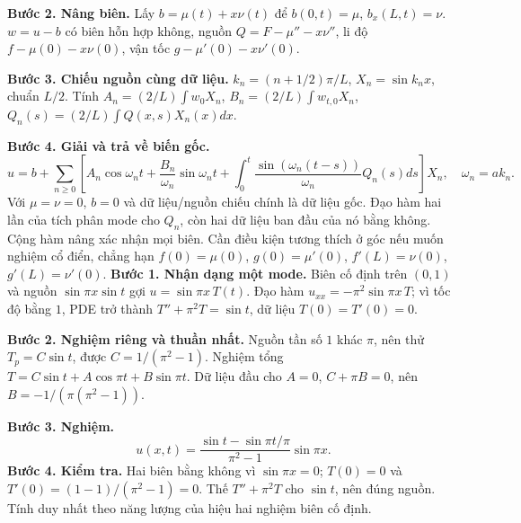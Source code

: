 \textbf{Bước 2. Nâng biên.} Lấy $b=\mu(t)+x\nu(t)$ để $b(0,t)=\mu$, $b_x(L,t)=\nu$. $w=u-b$ có biên hỗn hợp không, nguồn $Q=F-\mu''-x\nu''$, li độ $f-\mu(0)-x\nu(0)$, vận tốc $g-\mu'(0)-x\nu'(0)$.

\textbf{Bước 3. Chiếu nguồn cùng dữ liệu.} $k_n=(n+1/2)\pi/L$, $X_n=\sin k_nx$, chuẩn $L/2$. Tính $A_n=(2/L)\int w_0X_n$, $B_n=(2/L)\int w_{t,0}X_n$, $Q_n(s)=(2/L)\int Q(x,s)X_n(x)dx$.

\textbf{Bước 4. Giải và trả về biến gốc.}
\[u=b+\sum_{n\ge0}\left[A_n\cos\omega_nt+\frac{B_n}{\omega_n}\sin\omega_nt+\int_0^t\frac{\sin(\omega_n(t-s))}{\omega_n}Q_n(s)ds\right]X_n,\quad\omega_n=ak_n.\]
Với $\mu=\nu=0$, $b=0$ và dữ liệu/nguồn chiếu chính là dữ liệu gốc. Đạo hàm hai lần của tích phân mode cho $Q_n$, còn hai dữ liệu ban đầu của nó bằng không. Cộng hàm nâng xác nhận mọi biên. Cần điều kiện tương thích ở góc nếu muốn nghiệm cổ điển, chẳng hạn $f(0)=\mu(0)$, $g(0)=\mu'(0)$, $f'(L)=\nu(0)$, $g'(L)=\nu'(0)$.
\textbf{Bước 1. Nhận dạng một mode.} Biên cố định trên $(0,1)$ và nguồn $\sin\pi x\sin t$ gợi $u=\sin\pi x\,T(t)$. Đạo hàm $u_{xx}=-\pi^2\sin\pi x\,T$; vì tốc độ bằng $1$, PDE trở thành $T''+\pi^2T=\sin t$, dữ liệu $T(0)=T'(0)=0$.

\textbf{Bước 2. Nghiệm riêng và thuần nhất.} Nguồn tần số $1$ khác $\pi$, nên thử $T_p=C\sin t$, được $C=1/(\pi^2-1)$. Nghiệm tổng $T=C\sin t+A\cos\pi t+B\sin\pi t$. Dữ liệu đầu cho $A=0$, $C+\pi B=0$, nên $B=-1/(\pi(\pi^2-1))$.

\textbf{Bước 3. Nghiệm.}
\[u(x,t)=\frac{\sin t-\sin\pi t/\pi}{\pi^2-1}\sin\pi x.\]
\textbf{Bước 4. Kiểm tra.} Hai biên bằng không vì $\sin\pi x=0$; $T(0)=0$ và $T'(0)=(1-1)/(\pi^2-1)=0$. Thế $T''+\pi^2T$ cho $\sin t$, nên đúng nguồn. Tính duy nhất theo năng lượng của hiệu hai nghiệm biên cố định.
